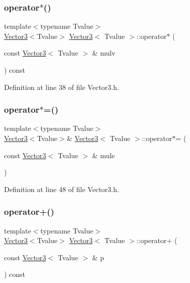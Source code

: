 \subsubsection{\texorpdfstring{operator$\ast$()}{operator*()}\hspace{0.1cm}{\footnotesize\ttfamily [2/2]}}
{\footnotesize\ttfamily template$<$typename Tvalue$>$ \\
\hyperlink{class_vector3}{Vector3}$<$Tvalue$>$ \hyperlink{class_vector3}{Vector3}$<$ Tvalue $>$\+::operator$\ast$ (\begin{DoxyParamCaption}\item[{const \hyperlink{class_vector3}{Vector3}$<$ Tvalue $>$ \&}]{mulv }\end{DoxyParamCaption}) const\hspace{0.3cm}{\ttfamily [inline]}}



Definition at line 38 of file Vector3.\+h.

\mbox{\label{class_vector3_a9e935ee74a6f8b917767b867cfa74a5d}} 
\subsubsection{\texorpdfstring{operator$\ast$=()}{operator*=()}}
{\footnotesize\ttfamily template$<$typename Tvalue$>$ \\
\hyperlink{class_vector3}{Vector3}$<$Tvalue$>$\& \hyperlink{class_vector3}{Vector3}$<$ Tvalue $>$\+::operator$\ast$= (\begin{DoxyParamCaption}\item[{const \hyperlink{class_vector3}{Vector3}$<$ Tvalue $>$ \&}]{mule }\end{DoxyParamCaption})\hspace{0.3cm}{\ttfamily [inline]}}



Definition at line 48 of file Vector3.\+h.

\mbox{\label{class_vector3_a69f0cdbed5fc093183e07fcc89a23136}} 
\subsubsection{\texorpdfstring{operator+()}{operator+()}}
{\footnotesize\ttfamily template$<$typename Tvalue$>$ \\
\hyperlink{class_vector3}{Vector3}$<$Tvalue$>$ \hyperlink{class_vector3}{Vector3}$<$ Tvalue $>$\+::operator+ (\begin{DoxyParamCaption}\item[{const \hyperlink{class_vector3}{Vector3}$<$ Tvalue $>$ \&}]{p }\end{DoxyParamCaption}) const\hspace{0.3cm}{\ttfamily [inline]}}



